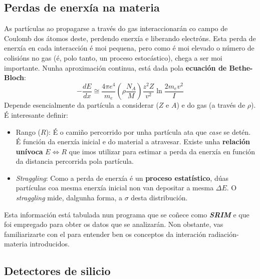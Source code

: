 \documentclass[11pt, a4paper]{article}
\begin{document}
\subsection{Perdas de enerxía na materia}\label{sec:de}
As partículas ao propagarse a través do gas interaccionarán co campo de Coulomb dos átomos deste, perdendo enerxía e liberando electróns. Esta perda de enerxía en cada interacción é moi pequena, pero como é moi elevado o número de colisións no gas (é, polo tanto, un proceso estocástico), chega a ser moi importante. Nunha aproximación continua, está dada pola \textbf{ecuación de Bethe-Bloch}:
\begin{equation*}\label{eq:stopping}
    - \frac{dE}{dx} \cong \frac{4 \pi e^4}{m_e} \left(\rho \frac{N_A}{M}\right)\frac{z^2 Z}{v^2} \ln{\frac{2m_e v^2}{I}}
\end{equation*}
Depende esencialmente da partícula a considerar ($Z$ e $A$) e do gas (a través de $\rho$). É interesante definir:
\begin{itemize}
    \item Rango ($R$): É o camiño percorrido por unha partícula ata que \textit{case} se detén. É función da enerxía inicial e do material a atravesar. Existe unha \textbf{relación unívoca} $E \Longleftrightarrow R$ que imos utilizar para estimar a perda da enerxía en función da distancia percorrida pola partícula.
    \item \textit{Straggling}: Como a perda de enerxía é un \textbf{proceso estatístico}, dúas partículas coa mesma enerxía inicial non van depositar a mesma $\Delta E$. O \textit{straggling} mide, dalgunha forma, a $\sigma$ desta distribución.
\end{itemize}
Esta información está tabulada nun programa que se coñece como \textit{\textbf{SRIM}} e que foi empregado para obter os datos que se analizarán. Non obstante, vas familiarizarte con el para entender ben os conceptos da interación radiación-materia introducidos.

\subsection{Detectores de silicio}
\end{document}
